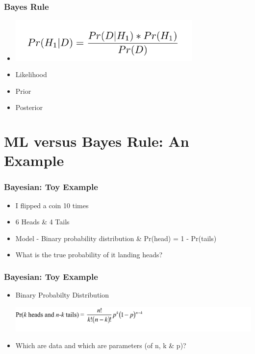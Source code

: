 \documentclass[14pt,handout]{beamer}
\begin{document}
\begin{frame}
\frametitle{Bayes Rule}
\begin{itemize}
\item[] 
	\begin{center}
	\includegraphics[width=0.75\textwidth]{images_20171130_bayes_final.png}
	\end{center}
	\item<+-> Likelihood
	\item<+-> Prior
	\item<+-> Posterior
\end{itemize}
\end{frame}

\section{ML versus Bayes Rule: An Example}

\begin{frame}
\frametitle{Bayesian: Toy Example}
\begin{itemize}
	\item<+-> I flipped a coin 10 times
	\item<+-> 6 Heads \& 4 Tails
	\item<+-> Model - Binary probability distribution \& Pr(head) = 1 - Pr(tails)
	\item<+-> What is the true probability of it landing heads?
\end{itemize}
\end{frame}

\begin{frame}
\frametitle{Bayesian: Toy Example}
\begin{itemize}
	\item<+-> Binary Probabilty Distribution
	\begin{center}
	\includegraphics[width=1.5\textwidth]{images_20171130_binProb.png}
	\end{center}
	\item<+-> Which are data and which are parameters (of n, k \& p)?
\end{itemize}
\end{frame}
\end{document}
